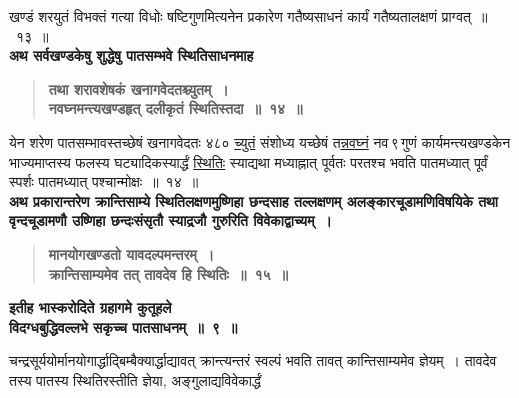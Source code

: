 \documentclass[11pt, openany]{book}
\begin{document}
\begin{sloppypar}
\noindent खण्डं शरयुतं विभक्तं गत्या विधोः षष्टिगुणमित्यनेन प्रकारेण गतैष्यसाधनं कार्यं गतैष्यतालक्षणं प्राग्वत्~॥~१३~॥\\

{\small \textbf{अथ सर्वखण्डकेषु शुद्धेषु पातसम्भवे स्थितिसाधनमाह\textendash }}

 \label{9.14}
\begin{quote}
{\large \textbf{{\color{purple}तथा शरावशेषकं खनागवेदतश्च्युतम्~। \\
नवघ्नमन्त्यखण्डहृत् दलीकृतं स्थितिस्तदा~॥~१४~॥}}}
\end{quote}

येन शरेण पातसम्भावस्तच्छेषं खनागवेदतः ४८० \hyperref[9.14]{च्युतं} संशोध्य यच्छेषं त\hyperref[9.14]{न्नवघ्नं} नव\textendash \,९\textendash \,गुणं कार्यमन्त्यखण्डकेन भाज्यमाप्तस्य फलस्य घट्यादिकस्यार्द्धं \hyperref[9.14]{स्थितिः} स्याद्यथा मध्याह्नात् पूर्वतः परतश्च भवति पातमध्यात् पूर्वं स्पर्शः पातमध्यात् पश्चान्मोक्षः~॥~१४~॥\\

{\small \textbf{अथ प्रकारान्तरेण क्रान्तिसाम्ये स्थितिलक्षणमुष्णिहा छन्दसाह तल्लक्षणम् अलङ्कारचूडामणिविषयिके तथा वृन्दचूडामणौ उष्णिहा छन्दःसंसृतौ स्याद्रजौ गुरुरिति विवेकाद्वाच्यम्~।}}

 \label{9.15}
\begin{quote}
{\large \textbf{{\color{purple}मानयोगखण्डतो यावदल्पमन्तरम्~।\\
क्रान्तिसाम्यमेव तत् तावदेव हि स्थितिः~॥~१५~॥}}}
\end{quote}

\begin{center}
{\large \textbf{इतीह भास्करोदिते ग्रहागमे कुतूहले \\
विदग्धबुद्धिवल्लभे सकृच्च पातसाधनम्~॥~९~॥}}
\end{center}

चन्द्रसूर्ययोर्मानयोगार्द्धाद्बिम्बैक्यार्द्धाद्यावत् क्रान्त्यन्तरं स्वल्पं भवति तावत् कान्तिसाम्यमेव ज्ञेयम्~। तावदेव तस्य पातस्य स्थितिरस्तीति ज्ञेया, अङ्गुलाद्यविवेकार्द्धं
\end{sloppypar}

\newpage
\end{document}
